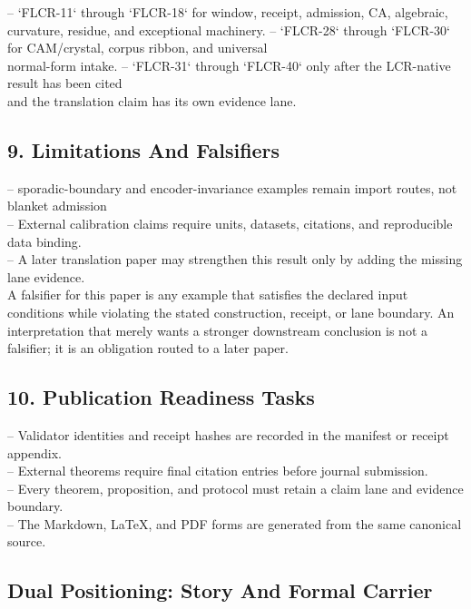 \documentclass[11pt]{article}
\begin{document}
\noindent{}-- `FLCR-11` through `FLCR-18` for window, receipt, admission, CA, algebraic,\\
  curvature, residue, and exceptional machinery.
\noindent{}-- `FLCR-28` through `FLCR-30` for CAM/crystal, corpus ribbon, and universal\\
  normal-form intake.
\noindent{}-- `FLCR-31` through `FLCR-40` only after the LCR-native result has been cited\\
  and the translation claim has its own evidence lane.

\subsection*{9. Limitations And Falsifiers}

\noindent{}-- sporadic-boundary and encoder-invariance examples remain import routes, not blanket admission\\
\noindent{}-- External calibration claims require units, datasets, citations, and reproducible data binding.\\
\noindent{}-- A later translation paper may strengthen this result only by adding the missing lane evidence.\\

A falsifier for this paper is any example that satisfies the declared input
conditions while violating the stated construction, receipt, or lane boundary.
An interpretation that merely wants a stronger downstream conclusion is not a
falsifier; it is an obligation routed to a later paper.

\subsection*{10. Publication Readiness Tasks}

\noindent{}-- Validator identities and receipt hashes are recorded in the manifest or receipt appendix.\\
\noindent{}-- External theorems require final citation entries before journal submission.\\
\noindent{}-- Every theorem, proposition, and protocol must retain a claim lane and evidence boundary.\\
\noindent{}-- The Markdown, LaTeX, and PDF forms are generated from the same canonical source.\\

\subsection*{Dual Positioning: Story And Formal Carrier}
\end{document}
